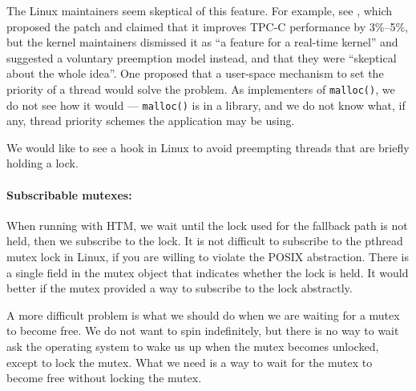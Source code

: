 \documentclass{sigplanconf}
\newcommand{\code}[1]{\texttt{#1}}
\begin{document}
The Linux maintainers seem skeptical of this feature.  For example,
see \cite{Aziz14}, which proposed the patch and claimed that it
improves TPC-C performance by 3\%--5\%, but the kernel maintainers
dismissed it as ``a feature for a real-time kernel'' and suggested a
voluntary preemption model instead, and that they were ``skeptical
about the whole idea''.  One proposed \cite{Oboguev14a, Oboguev14b}
that a user-space mechanism to set the priority of a thread would solve
the problem.  As implementers of \code{malloc()}, we do not see how it
would --- \code{malloc()} is in a library, and we do not know what, if
any, thread priority schemes the application may be using.

We would like to see a hook in Linux to avoid preempting threads that
are briefly holding a lock.

{\paragraph{Subscribable mutexes:}} When running with HTM, we wait
until the lock used for the fallback path is not held, then we
subscribe to the lock.  It is not difficult to subscribe to the
pthread mutex lock in Linux, if you are willing to violate the POSIX
abstraction.  There is a single field in the mutex object that
indicates whether the lock is held.  It would better if the mutex
provided a way to subscribe to the lock abstractly.

A more difficult problem is what we should do when we are waiting for
a mutex to become free.  We do not want to spin indefinitely, but
there is no way to wait ask the operating system to wake us up when
the mutex becomes unlocked, except to lock the mutex.  What we need is
a way to wait for the mutex to become free without locking the mutex. 

\end{document}
